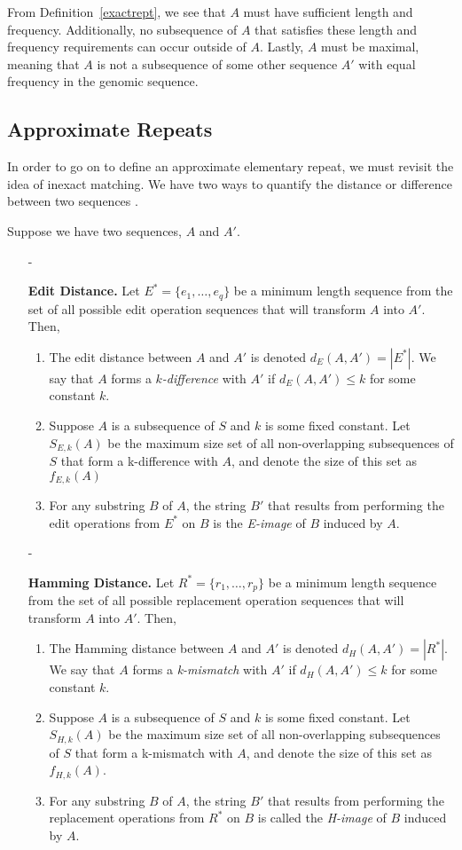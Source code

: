 From Definition~\ref{exactrept}, we see that $A$ must have sufficient length and frequency. Additionally, no subsequence of $A$ that satisfies these length and frequency requirements can occur outside of $A$. Lastly, $A$ must be maximal, meaning that $A$ is not a subsequence of some other sequence $A'$ with equal frequency in the genomic sequence.

\subsection{Approximate Repeats}
In order to go on to define an approximate elementary repeat, we must revisit the idea of inexact matching. We have two ways to quantify the distance or difference between two sequences \cite{kurtz2001reputer, zheng2005discovery}.
\begin{notate}
Suppose we have two sequences, $A$ and $A'$.
\begin{itemize}

\item[-]{\textbf{Edit Distance.} Let $E^*=\lbrace e_{1},\dotsc, e_{q} \rbrace$ be a minimum length sequence from the set of all possible edit operation sequences that will transform $A$ into $A'$. Then, 
\begin{enumerate}
\item{The edit distance between $A$ and $A'$ is denoted $d_{E}(A, A') = |E^*|$. We say that $A$ forms a \textit{$k$-difference} with $A'$ if $d_{E}(A, A') \leq k$ for some constant $k$.} 
\item{Suppose $A$ is a subsequence of $S$ and $k$ is some fixed constant. Let $S_{E,k}(A)$ be the maximum size set of all non-overlapping subsequences of $S$ that form a k-difference with $A$, and denote the size of this set as $f_{E,k}(A)$}
\item{For any substring $B$ of $A$, the string $B'$ that results from performing the edit operations from $E^*$ on $B$ is the \textit{E-image} of $B$ induced by $A$.}
\end{enumerate}}

\item[-]{\textbf{Hamming Distance.} Let $R^*=\lbrace r_{1}, \dotsc, r_{p}\rbrace$ be a minimum length sequence from the set of all possible replacement operation sequences that will transform $A$ into $A'$. Then,
\begin{enumerate}
\item{The Hamming distance between $A$ and $A'$ is denoted $d_{H}(A, A') = |R^*|$. We say that $A$ forms a \textit{k-mismatch} with $A'$ if $d_{H}(A, A') \leq k$ for some constant $k$.}
\item{Suppose $A$ is a subsequence of $S$ and $k$ is some fixed constant. Let $S_{H,k}(A)$ be the maximum size set of all non-overlapping subsequences of $S$ that form a k-mismatch with $A$, and denote the size of this set as $f_{H,k}(A)$.}
\item{For any substring $B$ of $A$, the string $B'$ that results from performing the replacement operations from $R^*$ on $B$ is called the \textit{H-image} of $B$ induced by $A$.}
\end{enumerate}}



\end{itemize}
\end{notate}
